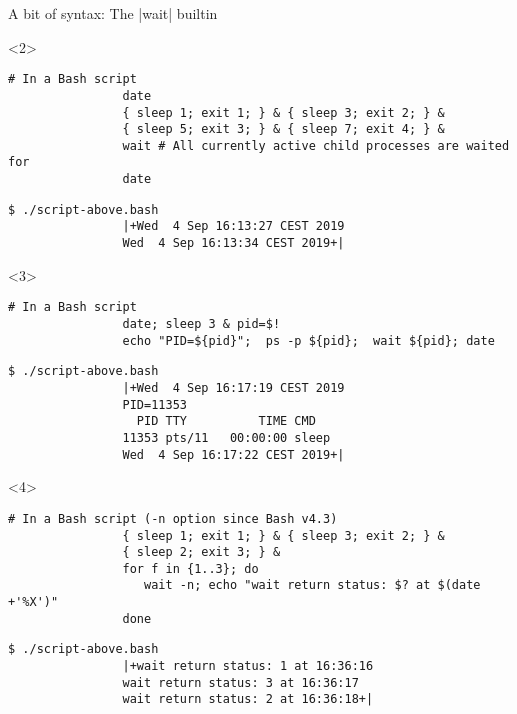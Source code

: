\begin{frame}[fragile]{A bit of syntax: The \bash|wait| builtin}
\begin{overlayarea}{\textwidth}{0.7\textheight}
        \begin{onlyenv}<2>
            \begin{lstlisting}[style=MyBash, numbers=none, aboveskip=3mm]
                # In a Bash script
                date
                { sleep 1; exit 1; } & { sleep 3; exit 2; } &
                { sleep 5; exit 3; } & { sleep 7; exit 4; } &
                wait # All currently active child processes are waited for
                date
            \end{lstlisting}
            \begin{lstlisting}[style=MyBash, numbers=none, aboveskip=1mm]
                $ ./script-above.bash
                |+Wed  4 Sep 16:13:27 CEST 2019
                Wed  4 Sep 16:13:34 CEST 2019+|
            \end{lstlisting}
        \end{onlyenv}
        \begin{onlyenv}<3>
            \begin{lstlisting}[style=MyBash, numbers=none, aboveskip=3mm]
                # In a Bash script
                date; sleep 3 & pid=$!
                echo "PID=${pid}";  ps -p ${pid};  wait ${pid}; date
            \end{lstlisting}
            \begin{lstlisting}[style=MyBash, numbers=none, aboveskip=1mm]
                $ ./script-above.bash
                |+Wed  4 Sep 16:17:19 CEST 2019
                PID=11353
                  PID TTY          TIME CMD
                11353 pts/11   00:00:00 sleep
                Wed  4 Sep 16:17:22 CEST 2019+|
            \end{lstlisting}
        \end{onlyenv}
        \begin{onlyenv}<4>
            \begin{lstlisting}[style=MyBash, numbers=none, aboveskip=3mm]
                # In a Bash script (-n option since Bash v4.3)
                { sleep 1; exit 1; } & { sleep 3; exit 2; } &
                { sleep 2; exit 3; } &
                for f in {1..3}; do
                   wait -n; echo "wait return status: $? at $(date +'%X')"
                done
            \end{lstlisting}
            \begin{lstlisting}[style=MyBash, numbers=none, aboveskip=1mm]
                $ ./script-above.bash
                |+wait return status: 1 at 16:36:16
                wait return status: 3 at 16:36:17
                wait return status: 2 at 16:36:18+|

\end{lstlisting}
\end{onlyenv}
\end{overlayarea}
\end{frame}

